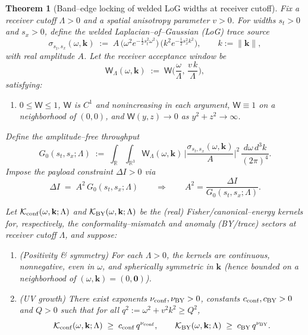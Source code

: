 \documentclass[10pt]{article}
\theoremstyle{definition}
\theoremstyle{plain}
\newtheorem{theorem}{Theorem}[section]
\begin{document}
\begin{theorem}[Band–edge locking of welded LoG widths at receiver cutoff]
\label{thm:band_edge_locking_exact}
Fix a receiver cutoff $\Lambda>0$ and a spatial anisotropy parameter $v>0$.
For widths $s_t>0$ and $s_x>0$, define the welded Laplacian–of–Gaussian (LoG) trace source
\[
\sigma_{s_t,s_x}(\omega,\mathbf k)
\;:=\;A\,\big(\omega^2 e^{-\tfrac{1}{2}s_t^2\omega^2}\big)\,\big(k^2 e^{-\tfrac{1}{2}s_x^2 k^2}\big),
\qquad k:=\|\mathbf k\|,
\]
with real amplitude $A$. Let the receiver acceptance window be
\[
\mathsf W_\Lambda(\omega,\mathbf k)\;:=\;\mathsf W\!\Big(\frac{\omega}{\Lambda},\,\frac{v\,k}{\Lambda}\Big),
\]
satisfying:
\begin{enumerate}
\item[(W1)] $0\le \mathsf W\le 1$, $\mathsf W$ is $C^1$ and nonincreasing in each argument,
$\mathsf W\equiv 1$ on a neighborhood of $(0,0)$, and $\mathsf W(y,z)\to 0$ as $y^2+z^2\to\infty$.
\end{enumerate}
Define the \emph{amplitude–free} throughput
\[
G_0(s_t,s_x;\Lambda)\;:=\;\int_{\mathbb R}\!\!\int_{\mathbb R^3}
\mathsf W_\Lambda(\omega,\mathbf k)\,\Big|\frac{\sigma_{s_t,s_x}(\omega,\mathbf k)}{A}\Big|^2\,
\frac{d\omega\,d^3k}{(2\pi)^4}.
\]
Impose the payload constraint $\Delta I>0$ via
\[
\Delta I\;=\;A^2\,G_0(s_t,s_x;\Lambda)\qquad\Rightarrow\qquad A^2=\frac{\Delta I}{G_0(s_t,s_x;\Lambda)}.
\]

Let $\mathcal K_{\rm conf}(\omega,\mathbf k;\Lambda)$ and $\mathcal K_{\rm BY}(\omega,\mathbf k;\Lambda)$ be the
(real) Fisher/canonical–energy kernels for, respectively, the conformality–mismatch and anomaly (BY/trace) sectors
at receiver cutoff $\Lambda$, and suppose:
\begin{enumerate}
\item[(K1)] (\emph{Positivity \& symmetry}) For each $\Lambda>0$, the kernels are continuous, nonnegative, even in $\omega$,
and spherically symmetric in $\mathbf k$ (hence bounded on a neighborhood of $(\omega,\mathbf k)=(0,\mathbf 0)$).

\item[(K2)] (\emph{UV growth}) There exist exponents $\nu_{\rm conf},\nu_{\rm BY}>0$, constants $c_{\rm conf},c_{\rm BY}>0$
and $Q>0$ such that for all $q^2:=\omega^2+v^2 k^2\ge Q^2$,
\[
\mathcal K_{\rm conf}(\omega,\mathbf k;\Lambda)\;\ge\;c_{\rm conf}\,q^{\nu_{\rm conf}},
\qquad
\mathcal K_{\rm BY}(\omega,\mathbf k;\Lambda)\;\ge\;c_{\rm BY}\,q^{\nu_{\rm BY}}.
\]


\end{enumerate}
\end{theorem}
\end{document}

